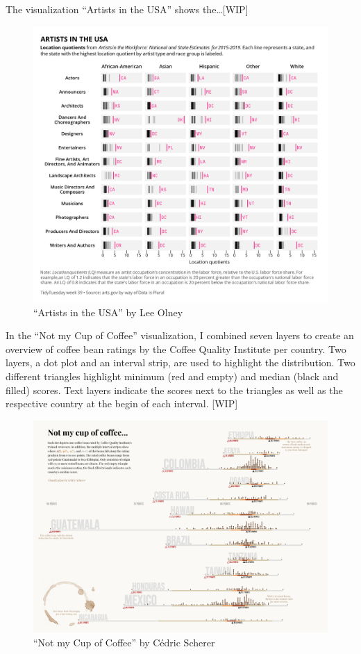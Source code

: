\documentclass[
]{krantz}
\begin{document}
The visualization ``Artists in the USA'' shows the\ldots{[}WIP{]}

\begin{figure}
\centering
\includegraphics{./img/artists-tt202239-lee-olney.png}
\caption{\label{fig:02imgVizArtistsUSA}``Artists in the USA'' by Lee Olney}
\end{figure}

In the ``Not my Cup of Coffee'' visualization, I combined seven layers to create an overview of coffee bean ratings by the Coffee Quality Institute per country. Two layers, a dot plot and an interval strip, are used to highlight the distribution. Two different triangles highlight minimum (red and empty) and median (black and filled) scores. Text layers indicate the scores next to the triangles as well as the respective country at the begin of each interval. {[}WIP{]}

\begin{figure}
\centering
\includegraphics{./img/coffee-ratings.png}
\caption{\label{fig:02imgVizCoffeeRatings}``Not my Cup of Coffee'' by Cédric Scherer}
\end{figure}
\end{document}
